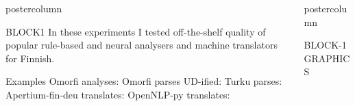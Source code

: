 \documentclass[final,hyperref={pdfpagelabels}]{beamer}
\newlength{\columnheight}
\begin{document}
\begin{frame}
      \maketitle
      \begin{columns}
      \begin{column}{.49\textwidth}
      \begin{beamercolorbox}[center,wd=\textwidth]{postercolumn}
          \begin{minipage}[T]{.95\textwidth}  %
          \parbox[t][\columnheight]{\textwidth}{ %
        \begin{block}{BLOCK1}
            In these experiments I tested off-the-shelf quality of popular
            rule-based and neural analysers and machine translators for Finnish.

        \end{block}

        \begin{block}{Examples}
            Omorfi analyses:
            \fbox{\OmorfiAnals}
            Omorfi parses UD-ified:
            \fbox{\OmorfiUDs}
            Turku parses:
            \fbox{\TurkuParses}
            Apertium-fin-deu translates:
            \fbox{\Apertiums}
            OpenNLP-py translates:
            \fbox{\OpenNLPs}
        \end{block}

         }
        \end{minipage}
      \end{beamercolorbox}
  \end{column}

   \begin{column}{.49\textwidth}
      \begin{beamercolorbox}[center,wd=\textwidth]{postercolumn}
        \begin{minipage}[T]{.95\textwidth} %
          \parbox[t][\columnheight]{\textwidth}{ %

        \begin{block}{BLOCK-1}
            GRAPHICS
        \end{block}

}
\end{minipage}
\end{beamercolorbox}
\end{column}
\end{columns}
\end{frame}
\end{document}
